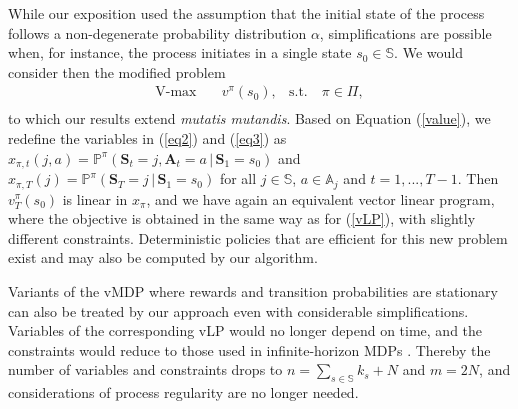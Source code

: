 \documentclass{article}
\theoremstyle{definition}
\numberwithin{equation}{section}
\begin{document}
While our exposition used the assumption that the initial state of the process follows a non-degenerate probability distribution $\alpha$,
simplifications are possible when, for instance, 
the process initiates in a single state $s_0 \in \mathbb{S}$. 
We would consider then the modified problem 
\begin{equation*}
\begin{aligned}
\operatorname{V-max} \quad & v^{\pi}(s_0), & \textrm{s.t.} \quad \pi \in \Pi,\\
\end{aligned}
\end{equation*}   
to which  our results extend  \textit{mutatis mutandis}. 
Based on Equation (\ref{value}), we redefine the variables in (\ref{eq2}) and (\ref{eq3}) as 
$x_{\pi, t}(j, a) = \mathbb{P}^{\pi}(\textbf{S}_t = j, \textbf{A}_t = a \,|\, \textbf{S}_1 = s_0)$ and 
$x_{\pi, T}(j) = \mathbb{P}^{\pi}(\textbf{S}_T = j \,|\, \textbf{S}_1 = s_0)$ for all $j \in \mathbb{S}$, $a \in \mathbb{A}_j$ and $t = 1, ..., T-1$. Then $v_{T}^{\pi}(s_0)$ is linear in $x_{\pi}$, and we have again an equivalent vector linear program, where the objective is obtained
in the same way as for (\ref{vLP}), with slightly different constraints. Deterministic policies that are efficient for this new problem exist and may also be 
computed by our algorithm.     


Variants of the vMDP where rewards and transition probabilities are stationary can also be treated
by our approach 
even with considerable simplifications. 
Variables of the corresponding vLP would no longer depend on time, and the constraints would reduce to those used in infinite-horizon MDPs \cite[p. 245]{16}. 
Thereby the number of variables and constraints drops to $n = \sum_{s \in \mathbb{S}}k_s + N$ and $m = 2N$, 
and considerations of process regularity are no longer needed.  
\\
\end{document}
